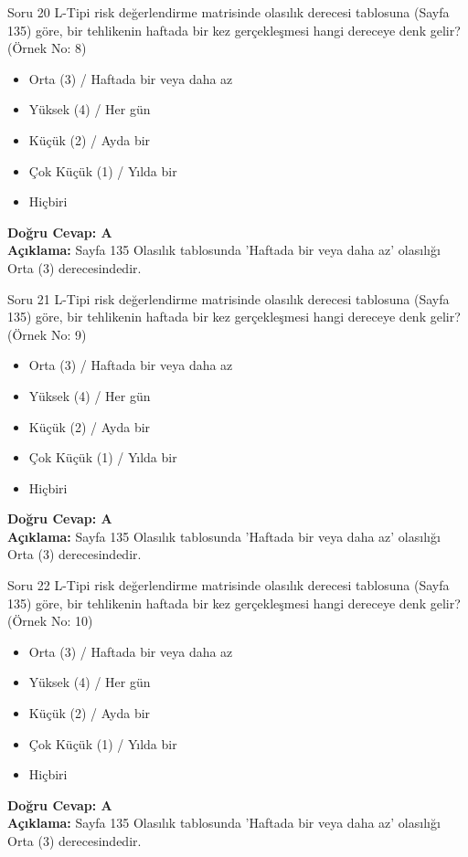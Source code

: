 \documentclass[12pt,a4paper]{article}
\begin{document}
\begin{testcard}{Soru 20}
    L-Tipi risk değerlendirme matrisinde olasılık derecesi tablosuna (Sayfa 135) göre, bir tehlikenin haftada bir kez gerçekleşmesi hangi dereceye denk gelir? (Örnek No: 8)
    \begin{itemize}
        \item[A)] Orta (3) / Haftada bir veya daha az
        \item[B)] Yüksek (4) / Her gün
        \item[C)] Küçük (2) / Ayda bir
        \item[D)] Çok Küçük (1) / Yılda bir
        \item[E)] Hiçbiri
    \end{itemize}
    \tcblower
    \textbf{Doğru Cevap: A} \\
    \textbf{Açıklama:} Sayfa 135 Olasılık tablosunda 'Haftada bir veya daha az' olasılığı Orta (3) derecesindedir.
\end{testcard}

\begin{testcard}{Soru 21}
    L-Tipi risk değerlendirme matrisinde olasılık derecesi tablosuna (Sayfa 135) göre, bir tehlikenin haftada bir kez gerçekleşmesi hangi dereceye denk gelir? (Örnek No: 9)
    \begin{itemize}
        \item[A)] Orta (3) / Haftada bir veya daha az
        \item[B)] Yüksek (4) / Her gün
        \item[C)] Küçük (2) / Ayda bir
        \item[D)] Çok Küçük (1) / Yılda bir
        \item[E)] Hiçbiri
    \end{itemize}
    \tcblower
    \textbf{Doğru Cevap: A} \\
    \textbf{Açıklama:} Sayfa 135 Olasılık tablosunda 'Haftada bir veya daha az' olasılığı Orta (3) derecesindedir.
\end{testcard}

\begin{testcard}{Soru 22}
    L-Tipi risk değerlendirme matrisinde olasılık derecesi tablosuna (Sayfa 135) göre, bir tehlikenin haftada bir kez gerçekleşmesi hangi dereceye denk gelir? (Örnek No: 10)
    \begin{itemize}
        \item[A)] Orta (3) / Haftada bir veya daha az
        \item[B)] Yüksek (4) / Her gün
        \item[C)] Küçük (2) / Ayda bir
        \item[D)] Çok Küçük (1) / Yılda bir
        \item[E)] Hiçbiri
    \end{itemize}
    \tcblower
    \textbf{Doğru Cevap: A} \\
    \textbf{Açıklama:} Sayfa 135 Olasılık tablosunda 'Haftada bir veya daha az' olasılığı Orta (3) derecesindedir.
\end{testcard}
\end{document}
